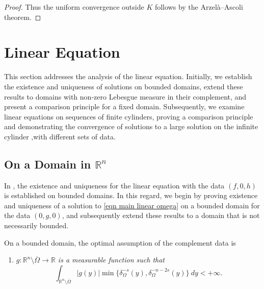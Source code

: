 \documentclass{amsart}
\makeatletter
\newcommand{\R}{\mathbb{R}}
\newcommand{\rn}{\mathbb{R}^{n}}
\newcommand{\myitem}[1]{%
\medskip \item[#1]\protected@edef\@currentlabel{#1}%
}
\makeatother
\begin{document}
\begin{proof}
    Thus the uniform convergence outside $K$ follows by the Arzelà–Ascoli theorem.
     \end{proof}




\section{Linear Equation}\label{section linear}
This section addresses the analysis of the linear equation. Initially, we establish the existence and uniqueness of solutions on bounded domains, extend these results to domains with non-zero Lebesgue measure in their complement, and present a comparison principle for a fixed domain. Subsequently, we examine linear equations on sequences of finite cylinders, proving a comparison principle and demonstrating the convergence of solutions to a large solution on the infinite cylinder ,with different sets of data.

\subsection{On a Domain in $\rn$}
In \cite{AbatangeloVazquez2023}, the existence and uniqueness for the linear equation with the data $(f,0,h)$ is established on bounded domains. In this regard, we begin by proving existence and uniqueness of a solution to \eqref{eqn main linear omega} on a bounded domain for the data $(0,g,0)$, and subsequently extend these results to a domain that is not necessarily bounded.

On a bounded domain, the optimal assumption of the complement data is
\begin{enumerate}
    \myitem{$\textbf{(G1)}$} \label{G1}\textit{ $g:\R^{n}\setminus\overline{\Omega} \to \R$ is a measurable function such that 
\begin{equation}\label{eqn condition on g}
    \int_{\R^{n}\setminus\overline{\Omega}}|g(y)|\min\{\delta_{\Omega}^{-s}(y),\delta_{\Omega}^{-n-2s}(y)\}\ dy <+\infty.
\end{equation}}
\end{enumerate}
\end{document}
